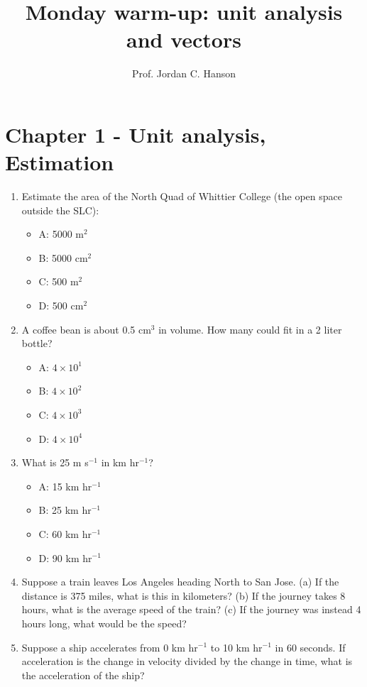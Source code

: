 \documentclass{article}
\begin{document}
\twocolumn

\title{Monday warm-up: unit analysis and vectors}
\author{Prof. Jordan C. Hanson}

\maketitle

\section{Chapter 1 - Unit analysis, \\ Estimation}

\begin{enumerate}
\item Estimate the area of the North Quad of Whittier College (the open space outside the SLC):
\begin{itemize}
\item A: 5000 m$^2$
\item B: 5000 cm$^2$
\item C: 500 m$^2$
\item D: 500 cm$^2$
\end{itemize}
\item A coffee bean is about 0.5 cm$^3$ in volume.  How many could fit in a 2 liter bottle?
\begin{itemize}
\item A: $4\times 10^{1}$
\item B: $4\times 10^{2}$
\item C: $4\times 10^{3}$
\item D: $4\times 10^{4}$
\end{itemize}
\item What is 25 m s$^{-1}$ in km hr$^{-1}$?
\begin{itemize}
\item A: 15 km hr$^{-1}$
\item B: 25 km hr$^{-1}$
\item C: 60 km hr$^{-1}$
\item D: 90 km hr$^{-1}$
\end{itemize}
\item Suppose a train leaves Los Angeles heading North to San Jose.  (a) If the distance is 375 miles, what is this in kilometers? (b) If the journey takes 8 hours, what is the average speed of the train?  (c) If the journey was instead 4 hours long, what would be the speed? \\ \vspace{2cm}
\item Suppose a ship accelerates from 0 km hr$^{-1}$ to 10 km hr$^{-1}$ in 60 seconds.  If acceleration is the change in velocity divided by the change in time, what is the acceleration of the ship? \\ \vspace{1cm}
\end{enumerate}
\end{document}
